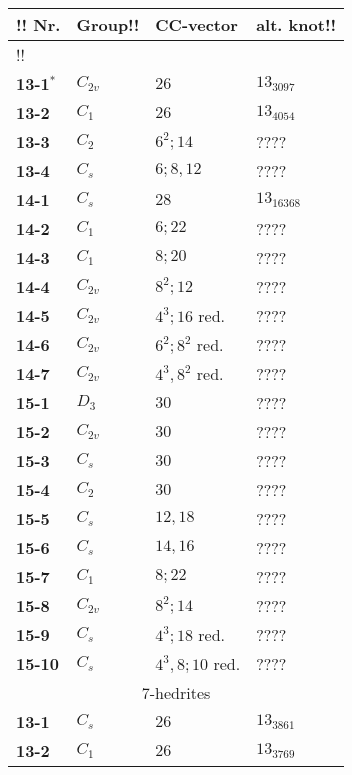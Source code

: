 \documentclass[12pt]{article}
\begin{document}
\begin{table}
\begin{center}
{\scriptsize
\begin{minipage}{7cm}
\begin{tabular}{||l|l|l|l||}
\hline \hline!!
Nr.     &Group!!    &CC-vector      &alt. knot!!\\\hline \hline!!
\multicolumn{4}{||c||}{$5$-hedrites}\\\hline 
{\bf 13-1${}^*$}&$C_{2v}$       &$26$           &$13_{3097}$\\
{\bf 13-2}      &$C_1$  &$26$           &$13_{4054}$\\
{\bf 13-3}      &$C_2$  &$6^2; 14$      &????\\
{\bf 13-4}      &$C_s$  &$6; 8, 12$     &????\\\hline
{\bf 14-1}      &$C_s$  &$28$           &$13_{16368}$\\
{\bf 14-2}      &$C_1$  &$6; 22$                &????\\
{\bf 14-3}      &$C_1$  &$8; 20$                &????\\
{\bf 14-4}      &$C_{2v}$       &$8^2; 12$      &????\\
{\bf 14-5}      &$C_{2v}$       &$4^3; 16$ red. &????\\
{\bf 14-6}      &$C_{2v}$       &$6^2; 8^2$ red.        &????\\
{\bf 14-7}      &$C_{2v}$       &$4^3, 8^2$ red.        &????\\\hline
{\bf 15-1}      &$D_3$  &$30$   &????\\
{\bf 15-2}      &$C_{2v}$       &$30$   &????\\
{\bf 15-3}      &$C_s$  &$30$   &????\\
{\bf 15-4}      &$C_2$  &$30$   &????\\
{\bf 15-5}      &$C_s$  &$12,18$        &????\\
{\bf 15-6}      &$C_s$  &$14,16$        &????\\
{\bf 15-7}      &$C_1$  &$8;22$ &????\\
{\bf 15-8}      &$C_{2v}$       &       $8^2;14$&????\\
{\bf 15-9}      &$C_s$  &$4^3; 18$ red. &????\\
{\bf 15-10}     &$C_s$  &$4^3, 8; 10$ red.      &????\\\hline
\hline
\multicolumn{4}{||c||}{$7$-hedrites}\\\hline
{\bf 13-1}      &$C_s$  &$26$           &$13_{3861}$\\
{\bf 13-2}      &$C_1$  &$26$           &$13_{3769}$\\

\end{tabular}
\end{minipage}}
\end{center}
\end{table}
\end{document}
